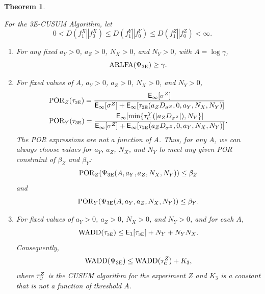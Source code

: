 \documentclass[journal, onecolumn]{IEEEtran}
\newtheorem{theorem}{Theorem}
\begin{document}
\begin{theorem}
\label{thm:3e}

For the \textup{3E-CUSUM} Algorithm, let 
$$ 0 < D(f_1^X \mathrel{\Vert} f_0^X) \leq D(f_1^Y \mathrel{\Vert} f_0^Y) \leq D(f_1^Z \mathrel{\Vert} f_0^Z) < \infty. $$

\begin{enumerate}
\item For any fixed $a_Y > 0$, $a_Z > 0$, $N_X > 0$, and $N_Y > 0$, with $A = \log \gamma$,
$$ \textup{ARLFA} (\Psi_{\textup{3E}}) \geq \gamma. $$

\item For fixed values of $A$, $a_Y > 0$, $a_Z > 0$, $N_X > 0$, and $N_Y > 0$,
\begin{align*}
& \textup{POR}_Z (\tau_{\textup{\fontsize{6 pt}{10 pt}\selectfont 3E}})  = \frac{\mathsf{E}_\infty [\sigma^Z]}{\mathsf{E}_\infty [\sigma^Z] + \mathsf{E}_\infty [\tau_{\textup{\fontsize{6 pt}{10 pt}\selectfont 2E}}(a_Z D_{\sigma^Z}, 0, a_Y, N_X, N_Y)]} \\
& \textup{POR}_Y (\tau_{\textup{\fontsize{6 pt}{10 pt}\selectfont 3E}})  = \frac{\mathsf{E}_\infty [\min
\{ \tau_{\textup{\fontsize{6 pt}{10 pt}\selectfont C}}^Y (\vert a_Z D_{\sigma^Z}\vert), N_Y \}]}{\mathsf{E}_\infty [\sigma^Z] + \mathsf{E}_\infty [\tau_{\textup{\fontsize{6 pt}{10 pt}\selectfont 2E}}(a_Z D_{\sigma^Z}, 0, a_Y, N_X, N_Y)]}.
\end{align*}
The POR expressions are not a function of $A$. Thus, for any $A$, we can always choose values for $a_Y$, $a_Z$, $N_X$, and $N_Y$ to meet any given POR constraint of $\beta_Z$ and $\beta_Y$:
$$ \textup{POR}_Z (\Psi_{\textup{3E}} (A, a_Y, a_Z, N_X, N_Y)) \leq \beta_Z $$
and
$$ \textup{POR}_Y (\Psi_{\textup{3E}} (A, a_Y, a_Z, N_X, N_Y)) \leq \beta_Y. $$

\item For fixed values of $a_Y > 0$, $a_Z > 0$, $N_X > 0$, and $N_Y > 0$, and for each $A$,
$$ \textup{WADD} (\tau_{\textup{\fontsize{6 pt}{10 pt}\selectfont 3E}}) \leq \mathsf{E}_1 [\tau_{\textup{\fontsize{6 pt}{10 pt}\selectfont 3E}}] + N_Y + N_Y N_X. $$
Consequently, 
$$ \textup{WADD} (\Psi_{\textup{3E}}) \leq \textup{WADD} (\tau_{\textup{\fontsize{6 pt}{10 pt}\selectfont C}}^Z) + K_3, $$
where $\tau_{\textup{\fontsize{6 pt}{10 pt}\selectfont C}}^Z$ is the \textup{CUSUM} algorithm for the experiment $Z$ and $K_3$ is a constant that is not a function of threshold $A$. 
\end{enumerate}
\end{theorem}
\end{document}
